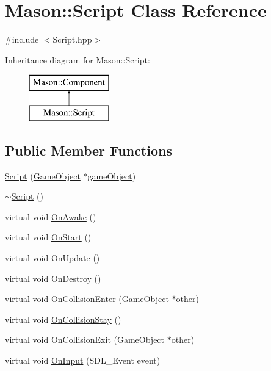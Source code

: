 \hypertarget{class_mason_1_1_script}{}\section{Mason\+:\+:Script Class Reference}
\label{class_mason_1_1_script}


{\ttfamily \#include $<$Script.\+hpp$>$}

Inheritance diagram for Mason\+:\+:Script\+:\begin{figure}[H]
\begin{center}
\leavevmode
\includegraphics[height=2.000000cm]{class_mason_1_1_script}
\end{center}
\end{figure}
\subsection*{Public Member Functions}
\begin{DoxyCompactItemize}
\item 
\hyperlink{class_mason_1_1_script_a11d07693e51f3e22894784a6ae7a761d}{Script} (\hyperlink{class_mason_1_1_game_object}{Game\+Object} $\ast$\hyperlink{class_mason_1_1_component_a30030370c35f5562cbbbb0927b0448c8}{game\+Object})
\item 
\hyperlink{class_mason_1_1_script_a4778729c907c1f4b55f7ef06467d5c47}{$\sim$\+Script} ()
\item 
virtual void \hyperlink{class_mason_1_1_script_a962ebc543d860213b90e0963edaaff5c}{On\+Awake} ()
\item 
virtual void \hyperlink{class_mason_1_1_script_aa42915c752bb7f4623ca679b222edf2f}{On\+Start} ()
\item 
virtual void \hyperlink{class_mason_1_1_script_acafa4283460fb677484bb43ebec37743}{On\+Update} ()
\item 
virtual void \hyperlink{class_mason_1_1_script_a59b174c3aa75b68a6f3d2b9803ee4287}{On\+Destroy} ()
\item 
virtual void \hyperlink{class_mason_1_1_script_a1088013d6edc47d74643aa48a7cbbbdf}{On\+Collision\+Enter} (\hyperlink{class_mason_1_1_game_object}{Game\+Object} $\ast$other)
\item 
virtual void \hyperlink{class_mason_1_1_script_a9649674f058f8e1b9229e93f3d9a34d7}{On\+Collision\+Stay} ()
\item 
virtual void \hyperlink{class_mason_1_1_script_a04d09648b7dba1bcb0a0ad3c3570e2f3}{On\+Collision\+Exit} (\hyperlink{class_mason_1_1_game_object}{Game\+Object} $\ast$other)
\item 
virtual void \hyperlink{class_mason_1_1_script_a84fff8072c4e8b56fb242b29f3491224}{On\+Input} (S\+D\+L\+\_\+\+Event event)
\end{DoxyCompactItemize}
